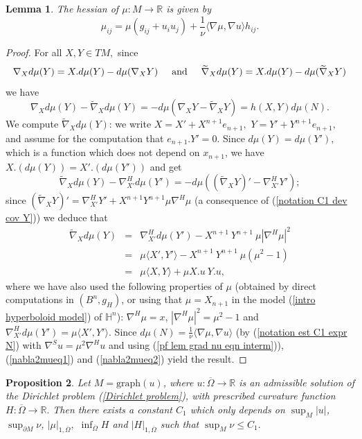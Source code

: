 \documentclass[10pt,reqno,oneside]{amsart}
\newtheorem{lem}{Lemma}[section]
\newtheorem{prop}[lem]{Proposition}
\theoremstyle{definition}
\theoremstyle{remark}
\newcommand{\R}{\mathbb{R}}
\begin{document}
\begin{lem}\label{hessianMmu}
The hessian of $\mu:M\rightarrow\R$ is given by 
\begin{equation}
\mu_{ij}=\mu (g_{ij}+u_i u_j)+\frac{1}{\nu}\langle\nabla\mu,\nabla u\rangle h_{ij}. 
\end{equation}
\end{lem}
\begin{proof}
For all $X,Y\in TM,$ since
$$\nabla_Xd\mu(Y)=X.d\mu(Y)-d\mu(\nabla_XY)\hspace{.5cm}\mbox{and}\hspace{.5cm}\widetilde{\nabla}_Xd\mu(Y)=X.d\mu(Y)-d\mu(\widetilde{\nabla}_XY)$$
we have
\begin{equation}\label{nabla2mueq1}
\nabla_Xd\mu(Y)-\widetilde{\nabla}_Xd\mu(Y)=-d\mu(\nabla_XY-\widetilde{\nabla}_XY)=h(X,Y)d\mu(N).
\end{equation}
We compute $\widetilde{\nabla}_Xd\mu(Y)$: we write $X=X'+X^{n+1}e_{n+1},$ $Y=Y'+Y^{n+1}e_{n+1},$ and assume for the computation that $e_{n+1}.Y'=0.$ Since $d\mu(Y)=d\mu(Y'),$ which is a function which does not depend on $x_{n+1}$, we have $X.(d\mu(Y))=X'.(d\mu(Y'))$ and get
$$\widetilde{\nabla}_Xd\mu(Y)-\nabla^H_{X'}d\mu(Y')=-d\mu\left((\widetilde{\nabla}_XY)'-\nabla^H_{X'}Y'\right);$$
since $(\widetilde{\nabla}_XY)'=\nabla^H_{X'}Y'+X^{n+1}Y^{n+1}\mu\nabla^H\mu$ (a consequence of (\ref{notation C1 dev cov Y})) we deduce that
\begin{eqnarray}
\widetilde{\nabla}_Xd\mu(Y)&=&\nabla^H_{X'}d\mu(Y')-X^{n+1}\ Y^{n+1}\ \mu|\nabla^H\mu|^2\nonumber\\
&=&\mu\langle X',Y'\rangle-X^{n+1}\ Y^{n+1}\ \mu(\mu^2-1)\nonumber\\
&=&\mu\langle X,Y\rangle+\mu X.u\ Y.u,\label{nabla2mueq2}
\end{eqnarray}
where we have also used the following properties of $\mu$ (obtained by direct computations in $(B^n,g_H)$, or using that $\mu=X_{n+1}$ in the model (\ref{intro hyperboloid model}) of $\mathbb{H}^n$): $\nabla^H\mu=x$, $|\nabla^H\mu|^2=\mu^2-1$ and $\nabla^H_{X'}d\mu(Y')=\mu\langle X',Y'\rangle.$ Since $d\mu(N)=\frac{1}{\nu}\langle\nabla\mu,\nabla u\rangle$ (by (\ref{notation est C1 expr N}) with $\nabla^Su=\mu^2\nabla^Hu$ and using (\ref{pf lem grad nu eqn interm})), (\ref{nabla2mueq1}) and (\ref{nabla2mueq2}) yield the result.
\end{proof}
\begin{prop}
Let $M=\mbox{graph}(u)$, where $u:\overline{\Omega}\rightarrow\R$ is an admissible solution of the Dirichlet problem (\ref{Dirichlet problem}), with prescribed curvature function $H:\overline{\Omega}\rightarrow\R.$ Then there exists a constant $C_1$ which only depends on $\sup_M|u|$, $\sup_{\partial M}\nu$, $|\mu|_{1,\overline{\Omega}},$ $\inf_{\overline{\Omega}}H$ and $|H|_{1,\overline{\Omega}}$ such that $\sup_M\nu\leq C_1.$
\end{prop}
\end{document}
